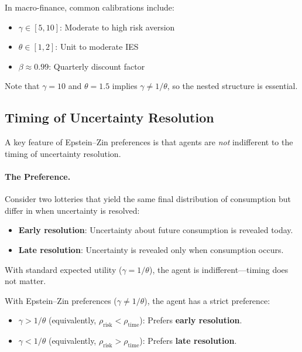 \begin{calloutnote}
In macro-finance, common calibrations include:
\begin{itemize}[leftmargin=1.5em]
    \item $\gamma \in [5, 10]$: Moderate to high risk aversion
    \item $\theta \in [1, 2]$: Unit to moderate IES
    \item $\beta \approx 0.99$: Quarterly discount factor
\end{itemize}
Note that $\gamma = 10$ and $\theta = 1.5$ implies $\gamma \neq 1/\theta$, so the nested structure is essential.
\end{calloutnote}

\subsection{Timing of Uncertainty Resolution}
\label{subsec:timing-resolution}

A key feature of Epstein--Zin preferences is that agents are \emph{not} indifferent to the timing of uncertainty resolution.

\paragraph{The Preference.}
Consider two lotteries that yield the same final distribution of consumption but differ in when uncertainty is resolved:
\begin{itemize}[leftmargin=2em]
    \item \textbf{Early resolution}: Uncertainty about future consumption is revealed today.
    \item \textbf{Late resolution}: Uncertainty is revealed only when consumption occurs.
\end{itemize}

With standard expected utility ($\gamma = 1/\theta$), the agent is indifferent---timing does not matter.

With Epstein--Zin preferences ($\gamma \neq 1/\theta$), the agent has a strict preference:
\begin{itemize}[leftmargin=2em]
    \item $\gamma > 1/\theta$ (equivalently, $\rho_{\text{risk}} < \rho_{\text{time}}$): Prefers \textbf{early resolution}.
    \item $\gamma < 1/\theta$ (equivalently, $\rho_{\text{risk}} > \rho_{\text{time}}$): Prefers \textbf{late resolution}.
\end{itemize}

